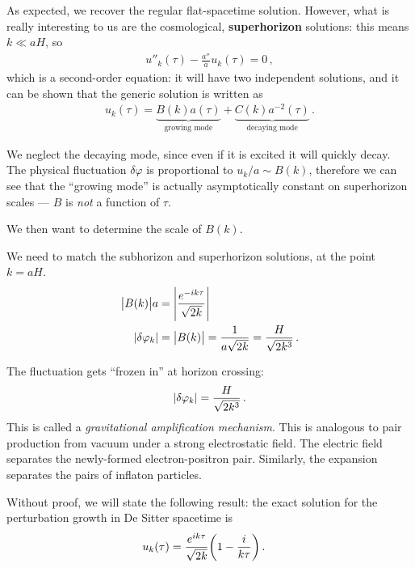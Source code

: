 \documentclass[main.tex]{subfiles}
\begin{document}
As expected, we recover the regular flat-spacetime solution.
However, what is really interesting to us are the cosmological, \textbf{superhorizon} solutions: this means \(k \ll a H\), so 
%
\begin{align}
u''_k (\tau ) - \frac{a''}{a} u_k (\tau ) = 0
\,,
\end{align}
%
which is a second-order equation: it will have two independent solutions, and it can be shown that the generic solution is written as 
%
\begin{align}
u_k(\tau ) = \underbrace{B(k) a(\tau )}_{\text{growing mode}} + \underbrace{C(k) a^{-2}(\tau )}_{\text{decaying mode}}
\,.
\end{align}

We neglect the decaying mode, since even if it is excited it will quickly decay.
The physical fluctuation \(\delta \varphi \) is proportional to \(u_k /a \sim B(k)\), therefore we can see that the ``growing mode'' is actually asymptotically constant on superhorizon scales --- \(B\) is \emph{not} a function of \(\tau \). 

We then want to determine the scale of \(B(k)\). 

We need to match the subhorizon and superhorizon solutions, at the point \(k = aH\). 
%
\begin{align}
\abs{B(k)} a &= \abs{\frac{e^{-ik \tau }}{\sqrt{2 k}}}   \\
\abs{ \delta \varphi _k} &= \abs{B(k)} = \frac{1}{a \sqrt{2k}} 
= \frac{H}{\sqrt{2 k^3}}
\,.
\end{align}
%

The fluctuation gets ``frozen in'' at horizon crossing: 
%
\begin{align}
\abs{ \delta \varphi _k} = \frac{H}{\sqrt{2 k^3}}
\,.
\end{align}
%
This is called a \emph{gravitational amplification mechanism}.
This is analogous to pair production from vacuum under a strong electrostatic field. The electric field separates the newly-formed electron-positron pair. 
Similarly, the expansion separates the pairs of inflaton particles.
 
Without proof, we will state the following result: the exact solution for the perturbation growth in De Sitter spacetime is 
%
\begin{align}
u_k (\tau ) &= \frac{e^{ik \tau }}{\sqrt{2 k}} \qty(1 - \frac{i}{k \tau })
\,.
\end{align}
%
 
\end{document}
